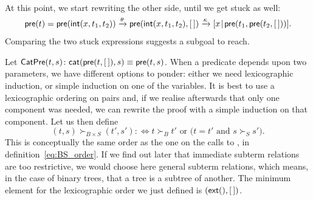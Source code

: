 At this point, we start rewriting the other side, until we get stuck
as well:
\begin{equation*}
  \fun{pre}(t) = \fun{pre}(\fun{int}(x,t_1,t_2))
\xrightarrow{\smash{\theta}} \fun{pre}(\fun{int}(x,t_1,t_2),\el)
\xrightarrow{\smash{\kappa}}
\cons{x}{\fun{pre}(t_1,\fun{pre}(t_2,\el))}.
\index{pre@\fun{pre/1}}
\index{pre@\fun{pre/2}}
\end{equation*}
Comparing the two stuck expressions suggests a subgoal to reach.

Let \(\textsf{CatPre}({t,s}) \colon \textsf{cat}(\textsf{pre}(t,[\,]),s) \equiv
\textsf{pre}(t,s)\). When
a predicate depends upon two parameters, we have different options to
ponder: either we need lexicographic induction, or simple induction on
one of the variables. It is best to use a lexicographic
ordering on pairs and, if we
realise afterwards that only one component was needed, we can rewrite
the proof with a simple induction on that component. Let us then
define
\begin{equation*}
(t,s) \succ_{B \times S} (t',s') :\Leftrightarrow \text{\(t \succ_{B}
    t'\) or (\(t = t'\) and \(s \succ_{S} s'\))}.
\end{equation*}
This is conceptually the same order as the one on the calls to
, in
definition~\eqref{eq:BS_order}. If we find out later that immediate
subterm relations are too restrictive, we would choose here general
subterm relations, which means, in the case of binary trees, that a
tree is a subtree of another. The minimum element for the
lexicographic order we just defined is \((\textsf{ext}(),[\,])\).

